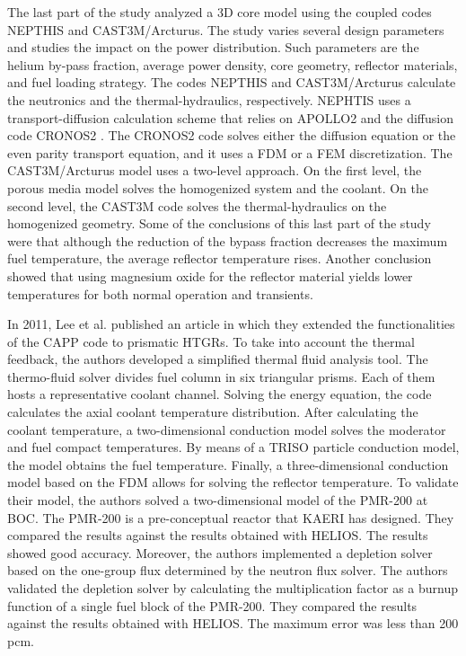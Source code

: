 \documentclass[11pt,letterpaper]{article}
\begin{document}
The last part of the study analyzed a 3D core model using the coupled codes NEPTHIS \cite{cavalier_presentation_2005} and CAST3M/Arcturus.
The study varies several design parameters and studies the impact on the power distribution.
Such parameters are the helium by-pass fraction, average power density, core geometry, reflector materials, and fuel loading strategy.
The codes NEPTHIS and CAST3M/Arcturus calculate the neutronics and the thermal-hydraulics, respectively.
NEPHTIS uses a transport-diffusion calculation scheme that relies on APOLLO2 and the diffusion code CRONOS2 \cite{lautard_cronos_1990}.
The CRONOS2 code solves either the diffusion equation or the even parity transport equation, and it uses a \gls{FDM} or a \gls{FEM} discretization.
The CAST3M/Arcturus model uses a two-level approach.
On the first level, the porous media model solves the homogenized system and the coolant.
On the second level, the CAST3M code solves the thermal-hydraulics on the homogenized geometry.
Some of the conclusions of this last part of the study were that although the reduction of the bypass fraction decreases the maximum fuel temperature, the average reflector temperature rises.
Another conclusion showed that using magnesium oxide for the reflector material yields lower temperatures for both normal operation and transients.






In 2011, Lee et al. published an article \cite{lee_development_2011} in which they extended the functionalities of the CAPP code to prismatic \glspl{HTGR}.
To take into account the thermal feedback, the authors developed a simplified thermal fluid analysis tool.
The thermo-fluid solver divides fuel column in six triangular prisms.
Each of them hosts a representative coolant channel.
Solving the energy equation, the code calculates the axial coolant temperature distribution.
After calculating the coolant temperature, a two-dimensional conduction model solves the moderator and fuel compact temperatures.
By means of a TRISO particle conduction model, the model obtains the fuel temperature.
Finally, a three-dimensional conduction model based on the \gls{FDM} allows for solving the reflector temperature.
To validate their model, the authors solved a two-dimensional model of the PMR-200 at \gls{BOC}.
The PMR-200 is a pre-conceptual reactor that \gls{KAERI} has designed.
They compared the results against the results obtained with HELIOS.
The results showed good accuracy.
Moreover, the authors implemented a depletion solver based on the one-group flux determined by the neutron flux solver.
The authors validated the depletion solver by calculating the multiplication factor as a burnup function of a single fuel block of the PMR-200.
They compared the results against the results obtained with HELIOS.
The maximum error was less than 200 pcm.
\end{document}
